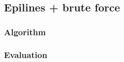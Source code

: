 \subsection{Epilines + brute force}
\label{sec:match:bruteforce}

\subsubsection{Algorithm}

\subsubsection{Evaluation}
